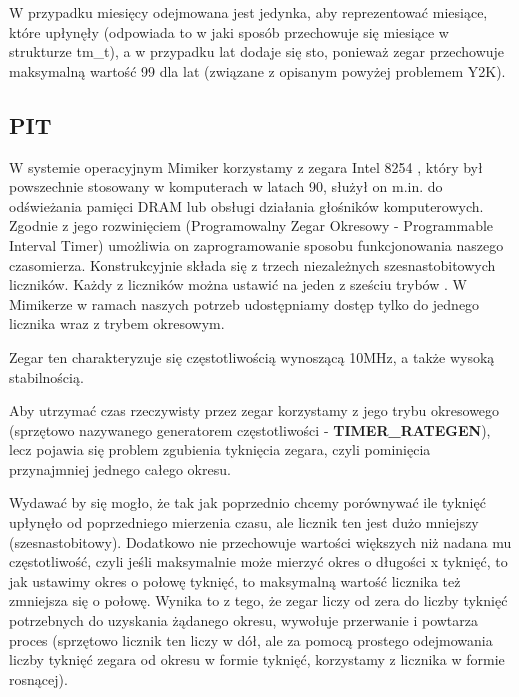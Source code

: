 \documentclass[shortabstract]{iithesis}
\theoremstyle{definition} \newtheorem*{definition}{Definicja}
\theoremstyle{definition} \newtheorem*{example}{Przykład}
\theoremstyle{definition} \newtheorem*{remark}{Uwaga}
\begin{document}
W przypadku miesięcy odejmowana jest jedynka, aby reprezentować miesiące, które upłynęły (odpowiada to w jaki sposób przechowuje się miesiące w strukturze tm\_t), a w przypadku lat dodaje się sto, ponieważ zegar przechowuje maksymalną wartość 99 dla lat (związane z opisanym powyżej problemem Y2K). 

\subsection{PIT}
W systemie operacyjnym Mimiker korzystamy z zegara Intel 8254 \cite{bib:pit}, który był powszechnie stosowany w komputerach w latach 90, służył on m.in. do odświeżania pamięci DRAM lub obsługi działania głośników komputerowych. Zgodnie z jego rozwinięciem (Programowalny Zegar Okresowy - Programmable Interval Timer) umożliwia on zaprogramowanie sposobu funkcjonowania naszego czasomierza. Konstrukcyjnie składa się z trzech niezależnych szesnastobitowych liczników. Każdy z liczników można ustawić na jeden z sześciu trybów \cite{bib:pit}. W Mimikerze w ramach naszych potrzeb udostępniamy dostęp tylko do jednego licznika wraz z trybem okresowym.

Zegar ten charakteryzuje się częstotliwością wynoszącą 10MHz, a także wysoką stabilnością. 

Aby utrzymać czas rzeczywisty przez zegar korzystamy z jego trybu okresowego (sprzętowo nazywanego generatorem częstotliwości - \textbf{TIMER\_RATEGEN}), lecz pojawia się problem zgubienia tyknięcia zegara, czyli pominięcia przynajmniej jednego całego okresu.

Wydawać by się mogło, że tak jak poprzednio chcemy porównywać ile tyknięć upłynęło od poprzedniego mierzenia czasu, ale licznik ten jest dużo mniejszy (szesnastobitowy). Dodatkowo nie przechowuje wartości większych niż nadana mu częstotliwość, czyli jeśli maksymalnie może mierzyć okres o długości x tyknięć, to jak ustawimy okres o połowę tyknięć, to maksymalną wartość licznika też zmniejsza się o połowę. Wynika to z tego, że zegar liczy od zera do liczby tyknięć potrzebnych do uzyskania żądanego okresu, wywołuje przerwanie i powtarza proces (sprzętowo licznik ten liczy w dół, ale za pomocą prostego odejmowania liczby tyknięć zegara od okresu w formie tyknięć, korzystamy z licznika w formie rosnącej).
\end{document}
